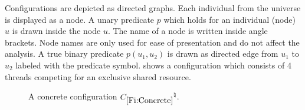 Configurations are depicted as directed graphs. Each individual
from the universe is displayed as a node. A unary predicate $p$
which holds for an individual (node) $u$ is drawn inside the node
$u$. The name of a node is written inside angle brackets. Node
names are only used for ease of presentation and do not affect the
analysis. A true binary predicate $p(u_1,u_2)$ is drawn as
directed edge from $u_1$ to $u_2$ labeled with the predicate
symbol.  shows a configuration which consists of
4 threads competing for an exclusive shared resource.

\begin{figure*}
\begin{center}
\end{center}
\caption{\label{Fi:Concrete}A concrete configuration
${{C_{\ref{Fi:Concrete}}}^\natural}$.}
\end{figure*}




